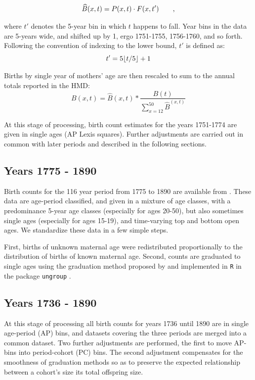 		\begin{equation}
\widehat{B}(x,t) = P(x,t) \cdot F(x,t') \quad\quad\text{,}
				\end{equation}
				
				where $t'$ denotes the 5-year bin in which $t$ happens to fall. Year bins in the data are 5-years wide, and shifted up by 1, ergo 1751-1755, 1756-1760, and so forth. Following the convention of indexing to the lower bound, $t'$ is defined as:
				\begin{equation}
				t' = 5\lfloor t/5\rfloor+1
				\end{equation}

Births by single year of mothers' age are then rescaled to sum to the annual totals reported in the HMD:
		\begin{equation}
		B(x,t) = \widehat{B}(x,t) * \frac{B(t)}{\sum _{x=12}^{50}\widehat{B}^(x,t)}
		\end{equation}
		
		At this stage of processing, birth count estimates for the years 1751-1774 are given in single ages (AP Lexis squares). Further adjustments are carried out in common with later periods and described in the following sections.
		
		\subsection{Years 1775 - 1890}
		\label{sec:sgf}
		Birth counts for the 116 year period from 1775 to 1890 are available from \citet{sgf1907}. These data are age-period classified, and given in a mixture of age classes, with a
		predominance 5-year age classes (especially for ages 20-50), but also sometimes
		single ages (especially for ages 15-19), and time-varying top and bottom open
		ages. We standardize these data in a few simple steps.
		
		First, births of unknown maternal age were redistributed proportionally to the distribution of births of known maternal age. Second, counts are graduated to single ages using the graduation method proposed by \citet{rizzi2015efficient} and implemented in \texttt{R} in the package \texttt{ungroup} \citep{ungroup}. 
		
		\subsection{Years 1736 - 1890}
		\label{sec:histadj}
		At this stage of processing all birth counts for years 1736 until 1890 are in single age-period (AP) bins, and datasets covering the three periods are merged into a common dataset. Two further adjustments are performed, the first to move AP-bins into period-cohort (PC) bins. The second adjustment compensates for the smoothness of graduation methods so as to preserve the expected relationship between a cohort's size its total offspring size.

